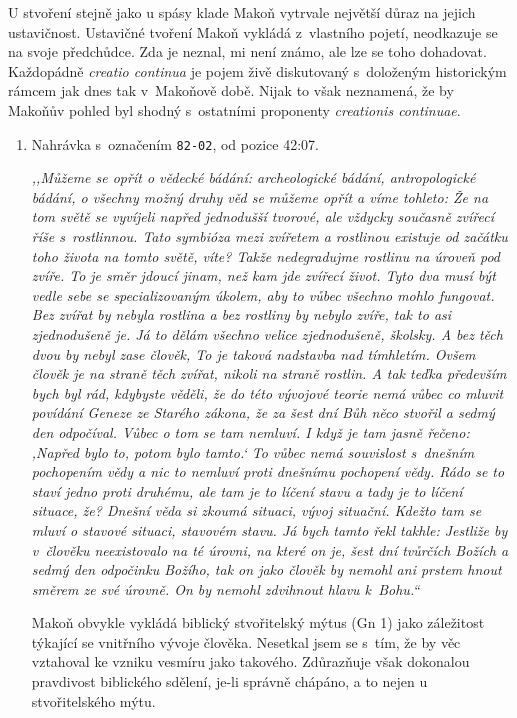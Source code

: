 U stvoření stejně jako u spásy klade Makoň vytrvale největší důraz na jejich
ustavičnost. Ustavičné tvoření Makoň vykládá z~vlastního pojetí, neodkazuje se
na svoje předchůdce. Zda je neznal, mi není známo, ale lze se toho dohadovat.
Každopádně \textit{creatio continua} je pojem živě diskutovaný s~doloženým
historickým rámcem jak dnes\cite{congdon2010creatio}\cite{Salim2022Creatio} tak
v~Makoňově době\cite{marcus1957typen}. Nijak to však neznamená, že by Makoňův
pohled byl shodný s~ostatními proponenty \textit{creationis continuae}.

\begin{enumerate}

\item{
Nahrávka s~označením \texttt{82-02}, od pozice 42:07.

\textit{%
,,Můžeme se opřít o vědecké bádání: archeologické bádání, antropologické bádání,
o všechny možný druhy věd se můžeme opřít a víme tohleto: Že na tom světě se
vyvíjeli napřed jednodušší tvorové, ale vždycky současně zvířecí říše
s~rostlinnou. Tato symbióza mezi zvířetem a rostlinou existuje od začátku toho
života na tomto světě, víte? Takže nedegradujme rostlinu na úroveň pod zvíře. To
je směr jdoucí jinam, než kam jde zvířecí život. Tyto dva musí být vedle sebe se
specializovaným úkolem, aby to vůbec všechno mohlo fungovat. Bez zvířat by
nebyla rostlina a bez rostliny by nebylo zvíře, tak to asi zjednodušeně je. Já
to dělám všechno velice zjednodušeně, školsky. A bez těch dvou by nebyl zase
člověk, To je taková nadstavba nad tímhletím. Ovšem člověk je na straně těch
zvířat, nikoli na straně rostlin. A tak teďka především bych byl rád, kdybyste
věděli, že do této vývojové teorie nemá vůbec co mluvit povídání Geneze ze
Starého zákona, že za šest dní Bůh něco stvořil a sedmý den odpočíval. Vůbec o
tom se tam nemluví. I když je tam jasně řečeno: ,Napřed bylo to, potom bylo
tamto.` To vůbec nemá souvislost s~dnešním pochopením vědy a nic to nemluví
proti dnešnímu pochopení vědy. Rádo se to staví jedno proti druhému, ale tam
je to líčení stavu a tady je to líčení situace, že? Dnešní věda si zkoumá
situaci, vývoj situační. Kdežto tam se mluví o stavové situaci, stavovém stavu.
Já bych tamto řekl takhle: Jestliže by v~člověku neexistovalo na té úrovni, na
které on je, šest dní tvůrčích Božích a sedmý den odpočinku Božího, tak on jako
člověk by nemohl ani prstem hnout směrem ze své úrovně. On by nemohl zdvihnout
hlavu k~Bohu.``
}

Makoň obvykle vykládá biblický stvořitelský mýtus (Gn 1) jako záležitost týkající se
vnitřního vývoje člověka. Nesetkal jsem se s~tím, že by věc vztahoval ke
vzniku vesmíru jako takového. Zdůrazňuje však dokonalou pravdivost
biblického sdělení, je-li správně chápáno, a to nejen u stvořitelského
mýtu.

}
\end{enumerate}
